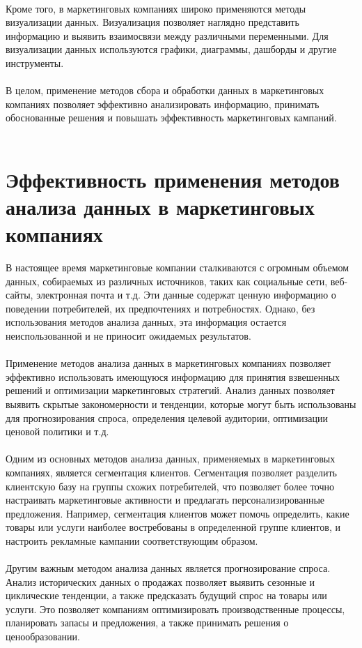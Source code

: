 \documentclass{article}
\begin{document}
~\\
Кроме того, в маркетинговых компаниях широко применяются методы визуализации данных. Визуализация позволяет наглядно представить информацию и выявить взаимосвязи между различными переменными. Для визуализации данных используются графики, диаграммы, дашборды и другие инструменты.\\
~\\
В целом, применение методов сбора и обработки данных в маркетинговых компаниях позволяет эффективно анализировать информацию, принимать обоснованные решения и повышать эффективность маркетинговых кампаний.\\
~\\

\newpage
\section{Эффективность применения методов анализа данных в маркетинговых компаниях}
В настоящее время маркетинговые компании сталкиваются с огромным объемом данных, собираемых из различных источников, таких как социальные сети, веб-сайты, электронная почта и т.д. Эти данные содержат ценную информацию о поведении потребителей, их предпочтениях и потребностях. Однако, без использования методов анализа данных, эта информация остается неиспользованной и не приносит ожидаемых результатов.\\
~\\
Применение методов анализа данных в маркетинговых компаниях позволяет эффективно использовать имеющуюся информацию для принятия взвешенных решений и оптимизации маркетинговых стратегий. Анализ данных позволяет выявить скрытые закономерности и тенденции, которые могут быть использованы для прогнозирования спроса, определения целевой аудитории, оптимизации ценовой политики и т.д.\\
~\\
Одним из основных методов анализа данных, применяемых в маркетинговых компаниях, является сегментация клиентов. Сегментация позволяет разделить клиентскую базу на группы схожих потребителей, что позволяет более точно настраивать маркетинговые активности и предлагать персонализированные предложения. Например, сегментация клиентов может помочь определить, какие товары или услуги наиболее востребованы в определенной группе клиентов, и настроить рекламные кампании соответствующим образом.\\
~\\
Другим важным методом анализа данных является прогнозирование спроса. Анализ исторических данных о продажах позволяет выявить сезонные и циклические тенденции, а также предсказать будущий спрос на товары или услуги. Это позволяет компаниям оптимизировать производственные процессы, планировать запасы и предложения, а также принимать решения о ценообразовании.\\
\end{document}
